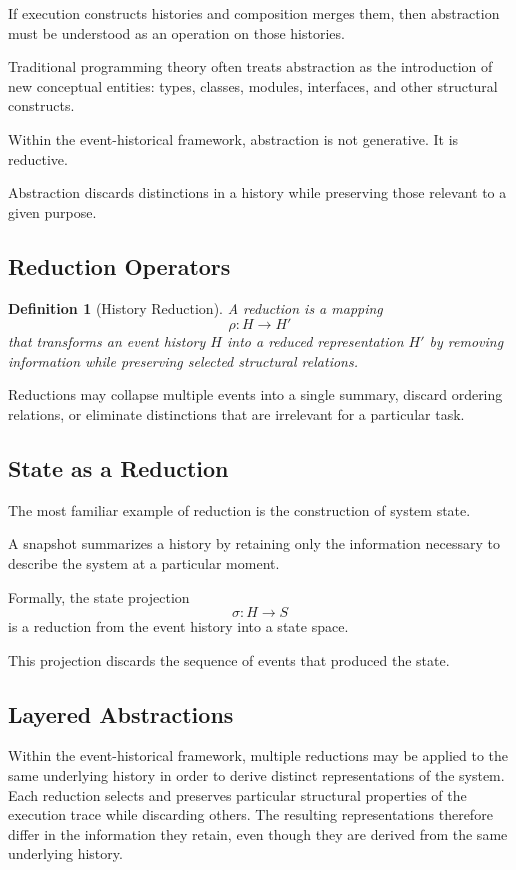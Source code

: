 \documentclass[12pt]{article}
\newtheorem{definition}{Definition}
\begin{document}
If execution constructs histories and composition merges them,
then abstraction must be understood as an operation on those
histories.

Traditional programming theory often treats abstraction
as the introduction of new conceptual entities:
types, classes, modules, interfaces, and other
structural constructs.

Within the event-historical framework, abstraction
is not generative. It is reductive.

Abstraction discards distinctions in a history
while preserving those relevant to a given purpose.

\subsection{Reduction Operators}

\begin{definition}[History Reduction]
A reduction is a mapping
\[
\rho : H \rightarrow H'
\]
that transforms an event history $H$ into a reduced
representation $H'$ by removing information while
preserving selected structural relations.
\end{definition}

Reductions may collapse multiple events into a single
summary, discard ordering relations, or eliminate
distinctions that are irrelevant for a particular task.

\subsection{State as a Reduction}

The most familiar example of reduction is the construction
of system state.

A snapshot summarizes a history by retaining only the
information necessary to describe the system at a
particular moment.

Formally, the state projection
\[
\sigma : H \rightarrow S
\]
is a reduction from the event history into a state space.

This projection discards the sequence of events
that produced the state.

\subsection{Layered Abstractions}

Within the event-historical framework, multiple reductions
may be applied to the same underlying history in order to
derive distinct representations of the system. Each reduction
selects and preserves particular structural properties of
the execution trace while discarding others. The resulting
representations therefore differ in the information they
retain, even though they are derived from the same underlying
history.
\end{document}
